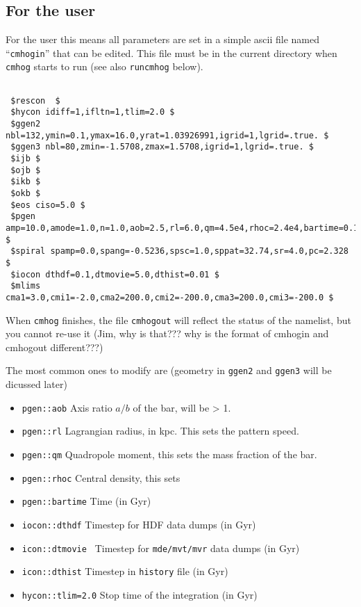 \documentclass[11pt,epsf]{article}
\begin{document}
\subsection{For the user}

For the user this means all parameters are set in a simple ascii file
named ``{\tt cmhogin}'' that can be edited. This file must be in the
current directory when {\tt cmhog} starts to run (see also
{\tt runcmhog} below).

\begin{verbatim}

 $rescon  $
 $hycon idiff=1,ifltn=1,tlim=2.0 $
 $ggen2 nbl=132,ymin=0.1,ymax=16.0,yrat=1.03926991,igrid=1,lgrid=.true. $
 $ggen3 nbl=80,zmin=-1.5708,zmax=1.5708,igrid=1,lgrid=.true. $
 $ijb $
 $ojb $
 $ikb $
 $okb $
 $eos ciso=5.0 $
 $pgen amp=10.0,amode=1.0,n=1.0,aob=2.5,rl=6.0,qm=4.5e4,rhoc=2.4e4,bartime=0.1 $
 $spiral spamp=0.0,spang=-0.5236,spsc=1.0,sppat=32.74,sr=4.0,pc=2.328 $
 $iocon dthdf=0.1,dtmovie=5.0,dthist=0.01 $
 $mlims cma1=3.0,cmi1=-2.0,cma2=200.0,cmi2=-200.0,cma3=200.0,cmi3=-200.0 $

\end{verbatim}

When {\tt cmhog} finishes, the file {\tt cmhogout} will reflect the status
of the namelist, but you cannot re-use it (Jim, why is that??? why is the
format of cmhogin and cmhogout different???)


The most common ones to modify are (geometry in {\tt ggen2} and {\tt ggen3}
will be dicussed later)

\begin{itemize}

\item
{\tt pgen::aob}
Axis ratio $a/b$ of the bar, will be > 1.

\item
{\tt pgen::rl}
Lagrangian radius, in kpc. This sets the pattern speed.

\item
{\tt pgen::qm}
Quadropole moment, this sets the mass fraction of the bar.

\item
{\tt pgen::rhoc}
Central density, this sets 

\item
{\tt pgen::bartime}
Time (in Gyr)

\item
{\tt iocon::dthdf}
Timestep for HDF data dumps (in Gyr)

\item
{\tt icon::dtmovie }
Timestep for {\tt mde/mvt/mvr} data dumps (in Gyr)

\item
{\tt icon::dthist}
Timestep in {\tt history} file (in Gyr)

\item
{\tt hycon::tlim=2.0}
Stop time of the integration (in Gyr)

\end{itemize}
\end{document}
